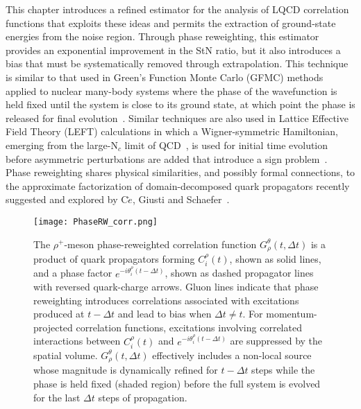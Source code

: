 This chapter introduces a refined estimator for the analysis of LQCD correlation functions that
exploits these ideas and
permits the extraction of 
ground-state energies from the noise region.
Through phase reweighting, this  estimator provides an exponential improvement in the StN ratio, but it also introduces a bias that must be 
systematically removed through extrapolation.  
This technique is similar to that used in Green's Function Monte Carlo (GFMC) methods  applied to  
nuclear many-body systems where the phase 
of the wavefunction is held fixed until the system is close to its ground state, at which 
point the phase is released for final evolution~\cite{Zhang:1995zz,Zhang:1996us,Wiringa:2000gb,Carlson:2014vla}. 
Similar techniques are also used in Lattice Effective Field Theory (LEFT) calculations in which a Wigner-symmetric Hamiltonian, 
emerging from the large-N$_c$ limit of QCD~\cite{Kaplan:1995yg}, 
is used for initial time evolution before asymmetric perturbations  are added that introduce a sign problem~\cite{Lahde:2015ona}.
Phase reweighting shares physical similarities, and possibly formal connections, 
to the approximate factorization of domain-decomposed quark propagators recently suggested and explored by 
C$\grave{e}$, Giusti and Schaefer~\cite{Ce:2016idq,Ce:2016ajy,Ce:2016qto}.


%
\begin{figure}[!t]
	\texttt{[image: PhaseRW\_corr.png]}
        \centering
		\caption{
	\label{fig:PRWcorrs} 
  The $\rho^+$-meson phase-reweighted correlation function $G^\theta_\rho(t,\Delta t)$ is a product
  of quark propagators forming $C_i^\rho(t)$, shown as solid lines,
  and a phase factor $e^{-i\theta_i^\rho(t-\Delta t)}$, shown as dashed propagator lines with reversed quark-charge arrows.
        Gluon lines indicate that phase reweighting introduces correlations
        associated with excitations produced at $t-\Delta t$
        and lead to bias when $\Delta t \neq t$.
        For momentum-projected correlation functions, 
        excitations involving correlated interactions between 
        $C_i^\rho(t)$ and $e^{-i\theta_i^\rho(t-\Delta t)}$ are suppressed by the spatial volume.
        $G^\theta_\rho(t,\Delta t)$ effectively includes a non-local source
        whose magnitude is dynamically refined for $t - \Delta t$ steps
        while the phase is held fixed (shaded region)
        before the full system is evolved for the last $\Delta t$ steps of propagation.
	}		
\end{figure}
%


